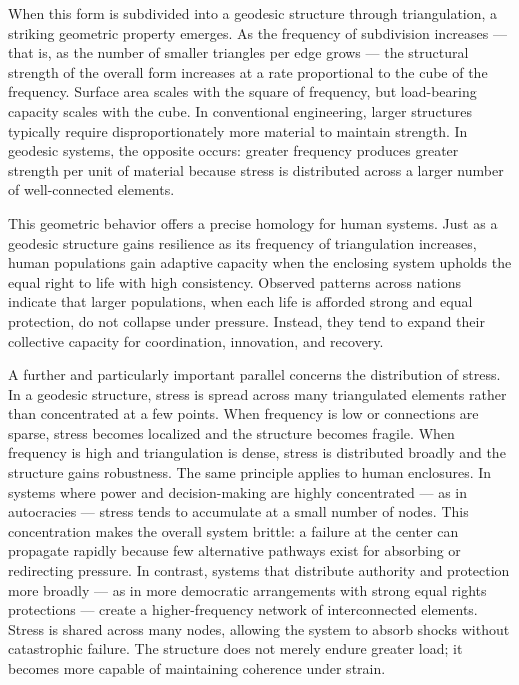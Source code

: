 When this form is subdivided into a geodesic structure through triangulation, a striking geometric property emerges. As the frequency of subdivision increases — that is, as the number of smaller triangles per edge grows — the structural strength of the overall form increases at a rate proportional to the cube of the frequency. Surface area scales with the square of frequency, but load-bearing capacity scales with the cube. In conventional engineering, larger structures typically require disproportionately more material to maintain strength. In geodesic systems, the opposite occurs: greater frequency produces greater strength per unit of material because stress is distributed across a larger number of well-connected elements.

This geometric behavior offers a precise homology for human systems. Just as a geodesic structure gains resilience as its frequency of triangulation increases, human populations gain adaptive capacity when the enclosing system upholds the equal right to life with high consistency. Observed patterns across nations indicate that larger populations, when each life is afforded strong and equal protection, do not collapse under pressure. Instead, they tend to expand their collective capacity for coordination, innovation, and recovery.

A further and particularly important parallel concerns the distribution of stress. In a geodesic structure, stress is spread across many triangulated elements rather than concentrated at a few points. When frequency is low or connections are sparse, stress becomes localized and the structure becomes fragile. When frequency is high and triangulation is dense, stress is distributed broadly and the structure gains robustness. The same principle applies to human enclosures. In systems where power and decision-making are highly concentrated — as in autocracies — stress tends to accumulate at a small number of nodes. This concentration makes the overall system brittle: a failure at the center can propagate rapidly because few alternative pathways exist for absorbing or redirecting pressure. In contrast, systems that distribute authority and protection more broadly — as in more democratic arrangements with strong equal rights protections — create a higher-frequency network of interconnected elements. Stress is shared across many nodes, allowing the system to absorb shocks without catastrophic failure. The structure does not merely endure greater load; it becomes more capable of maintaining coherence under strain.

